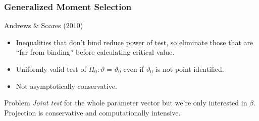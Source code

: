 \documentclass[handout]{beamer}
\begin{document}
\begin{frame}
  \frametitle{Generalized Moment Selection}

  \small

  \begin{block}{Andrews \& Soares (2010)}
    \begin{itemize}
      \item Inequalities that don't bind reduce power of test, so eliminate those that are ``far from binding'' before calculating critical value.
      \item Uniformly valid test of $H_0\colon \vartheta = \vartheta_0$ even if $\vartheta_0$ is not point identified. 
      \item Not asymptotically conservative.
    \end{itemize}
  \end{block}


  \begin{block}{Problem}
   \emph{Joint test} for the whole parameter vector but we're only interested in $\beta$.
   Projection is conservative and computationally intensive.
  \end{block}

\end{frame}
\end{document}
